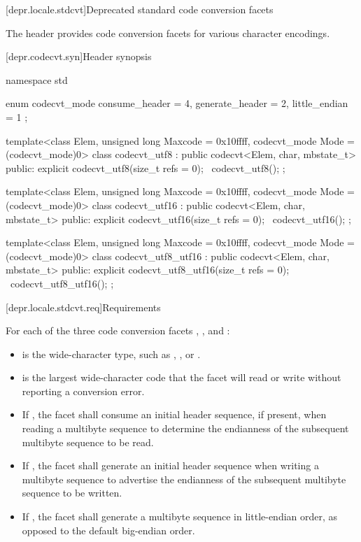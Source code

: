 [depr.locale.stdcvt]{Deprecated standard code conversion facets}

\pnum
{}%
The header  provides code conversion facets for various character encodings.

[depr.codecvt.syn]{Header  synopsis}

%
%
%
%
\begin{codeblock}
namespace std {
  enum codecvt_mode {
    consume_header = 4,
    generate_header = 2,
    little_endian = 1
  };

  template<class Elem, unsigned long Maxcode = 0x10ffff, codecvt_mode Mode = (codecvt_mode)0>
    class codecvt_utf8 : public codecvt<Elem, char, mbstate_t> {
    public:
      explicit codecvt_utf8(size_t refs = 0);
      ~codecvt_utf8();
    };

  template<class Elem, unsigned long Maxcode = 0x10ffff, codecvt_mode Mode = (codecvt_mode)0>
    class codecvt_utf16 : public codecvt<Elem, char, mbstate_t> {
    public:
      explicit codecvt_utf16(size_t refs = 0);
      ~codecvt_utf16();
    };

  template<class Elem, unsigned long Maxcode = 0x10ffff, codecvt_mode Mode = (codecvt_mode)0>
    class codecvt_utf8_utf16 : public codecvt<Elem, char, mbstate_t> {
    public:
      explicit codecvt_utf8_utf16(size_t refs = 0);
      ~codecvt_utf8_utf16();
    };
}
\end{codeblock}

[depr.locale.stdcvt.req]{Requirements}

\pnum
For each of the three code conversion facets ,
, and :
\begin{itemize}
\item
   is the wide-character type, such as
  , , or .
\item
   is the largest wide-character code that the facet
  will read or write without reporting a conversion error.
\item
  If , the facet shall consume an
  initial header sequence, if present, when reading a multibyte sequence
  to determine the endianness of the subsequent multibyte sequence to be read.
\item
  If , the facet shall generate an
  initial header sequence when writing a multibyte sequence to advertise
  the endianness of the subsequent multibyte sequence to be written.
\item
  If , the facet shall generate a
  multibyte sequence in little-endian order,
  as opposed to the default big-endian order.
\end{itemize}

